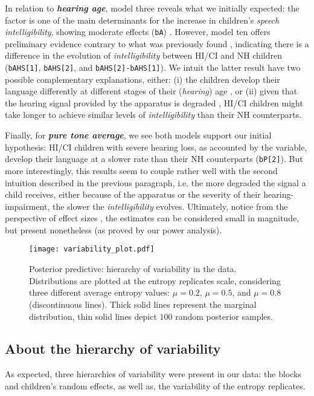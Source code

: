 In relation to \textbf{\textit{hearing age}}, model three reveals what we initially expected: the factor is one of the main determinants for the increase in children's \textit{speech intelligibility}, showing moderate effects (\texttt{bA}) \cite{Cohen_1988, Sawilowsky_2009}. However, model ten offers preliminary evidence contrary to what was previously found \cite{Boonen_et_al_2021}, indicating there is a difference in the evolution of \textit{intelligibility} between HI/CI and NH children (\texttt{bAHS[1]}, \texttt{bAHS[2]}, and \texttt{bAHS[2]-bAHS[1]}). We intuit the latter result have two possible complementary explanations, either: (i) the children develop their language differently at different stages of their (\textit{hearing}) age \cite{Flexer_2011}, or (ii) given that the hearing signal provided by the apparatus is degraded \cite{Drennan_et_al_2008}, HI/CI children might take longer to achieve similar levels of \textit{intelligibility} than their NH counterparts.

Finally, for \textbf{\textit{pure tone average}}, we see both models support our initial hypothesis: HI/CI children with severe hearing loss, as accounted by the variable, develop their language at a slower rate than their NH counterparts (\texttt{bP[2]}). But more interestingly, this results seem to couple rather well with the second intuition described in the previous paragraph, i.e. the more degraded the signal a child receives, either because of the apparatus or the severity of their hearing-impairment, the slower the \textit{intelligibility} evolves. Ultimately, notice from the perspective of effect sizes \cite{Cohen_1988, Sawilowsky_2009}, the estimates can be considered small in magnitude, but present nonetheless (as proved by our power analysis). 
%
%
\begin{figure}[!h]
	\centering
	\texttt{[image: variability\_plot.pdf]}
	\caption[Posterior predictive: hierarchy of variability in the data]{Posterior predictive: hierarchy of variability in the data. Distributions are plotted at the entropy replicates scale, considering three different average entropy values: $\mu=0.2$, $\mu=0.5$, and $\mu=0.8$ (discontinuous lines). Thick solid lines represent the marginal distribution, thin solid lines depict $100$ random posterior samples.}
	\label{fig:variability}
\end{figure}
%
%
\subsection{About the hierarchy of variability} \label{sS:results_variability}
%
As expected, three hierarchies of variability were present in our data: the blocks and children's random effects, as well as, the variability of the entropy replicates.


